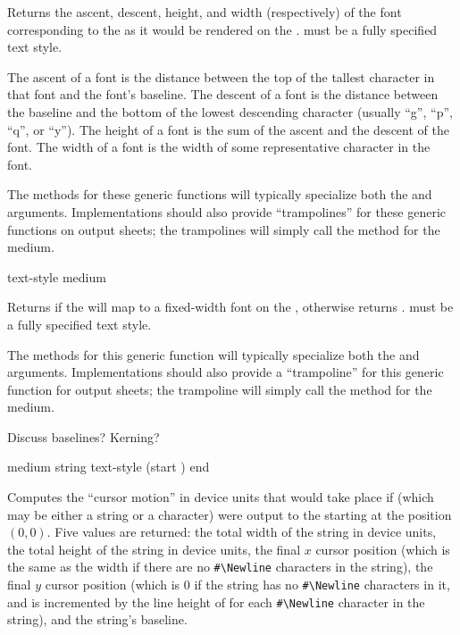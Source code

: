 Returns the ascent, descent, height, and width (respectively) of the font
corresponding to the   as it would be rendered
on the  .   must be a fully specified
text style.

The ascent of a font is the distance between the top of the tallest character in
that font and the font's baseline.  The descent of a font is the distance
between the baseline and the bottom of the lowest descending character (usually
``g'', ``p'', ``q'', or ``y'').  The height of a font is the sum of the ascent
and the descent of the font.  The width of a font is the width of some
representative character in the font.

The methods for these generic functions will typically specialize both the
 and  arguments.  Implementations should also
provide ``trampolines'' for these generic functions on output sheets; the
trampolines will simply call the method for the medium.


 {text-style medium}

Returns  if the   will map to a
fixed-width font on the  , otherwise returns
.   must be a fully specified text style.

The methods for this generic function will typically specialize both the
 and  arguments.  Implementations should also
provide a ``trampoline'' for this generic function for output sheets; the
trampoline will simply call the method for the medium.


 {Discuss baselines?  Kerning?}


 {medium string \key text-style (start ) end} 

Computes the ``cursor motion'' in device units that would take place if
 (which may be either a string or a character) were output to the
  starting at the position $(0,0)$.  Five values are
returned:  the total width of the string in device units, the total height of
the string in device units, the final $x$ cursor position (which is the same as
the width if there are no \verb+#\Newline+ characters in the string), the final
$y$ cursor position (which is 0 if the string has no \verb+#\Newline+ characters
in it, and is incremented by the line height of  for each
\verb+#\Newline+ character in the string), and the string's baseline.

